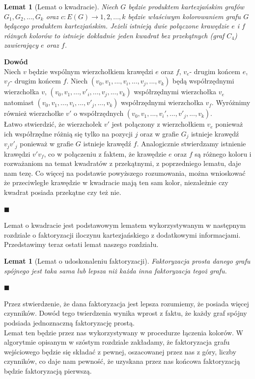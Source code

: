 \documentclass[12pt,a4paper,titlepage]{article}
\newtheorem{lem}[twr]{Lemat}
\newcommand\tab[1][1cm]{\hspace*{#1}}
\begin{document}
\begin{lem}[Lemat o kwadracie]
Niech $G$ będzie produktem kartezjańskim grafów $G_1, G_2, ... , G_k$ oraz $c: E(G) \rightarrow {1,2,...,k}$ będzie właściwym kolorowaniem grafu $G$ będącego produktem kartezjańskim. Jeżeli istnieją dwie połączone krawędzie $e$ i $f$ różnych kolorów to istnieje dokładnie jeden kwadrat bez przekątnych (graf $C_4$) zawierający $e$ oraz $f$.
\end{lem}
\textbf{Dowód}\\
\tab[0.6cm]Niech $v$ będzie wspólnym wierzchołkiem krawędzi $e$ oraz $f$, $v_e$- drugim końcem $e$, $v_f$- drugim końcem $f$. Niech $(v_0 , v_1, ... ,v_i, ..., v_j,...,v_k )$ będą współrzędnymi wierzchołka $v$, $(v_0 , v_1, ... ,v'_i, ..., v_j,...,v_k )$ współrzędnymi wierzchołka $v_e$ natomiast $(v_0 , v_1, ... ,v_i, ..., v'_j,...,v_k )$ współrzędnymi wierzchołka $v_f$. Wyróżnimy również wierzchołke $v'$ o współrzędnych $(v_0 , v_1, ...,v_i', ..., v'_j,...,v_k )$.\\
\tab[0.6cm]Łatwo stwierdzić, że wierzchołek $v'$ jest połączony z wierzchołkiem $v_e$ ponieważ ich współrzędne różnią się tylko na pozycji $j$ oraz w grafie $G_j$ istnieje krawędź $v_j v'_j$ ponieważ w grafie $G$ istnieje krawędź $f$. Analogicznie stwierdzamy istnienie krawędzi $v'v_f$, co w połączeniu z faktem, że krawędzie $e$ oraz $f$ są różnego koloru i rozważaniom na temat kwadratów z przekątnymi, z poprzedniego lematu, daje nam tezę. Co więcej na podstawie powyższego rozumowania, można wnioskować że przeciwległe krawędzie w kwadracie mają ten sam kolor, niezależnie czy kwadrat posiada przekątne czy też nie.
\begin{flushright}
$\blacksquare$
\end{flushright}
\tab[0.6cm]Lemat o kwadracie jest podstawowym lematem wykorzystywanym w następnym rozdziale o faktoryzacji iloczynu kartezjańskiego z dodatkowymi informacjami. \\
\tab[0.6cm]Przedstawimy teraz ostati lemat naszego rozdziału.\\
\begin{lem}[Lemat o udoskonaleniu faktoryzacji] 
Faktoryzacja prosta danego grafu spójnego jest taka sama lub lepsza niż każda inna faktoryzacja tegoż grafu.
\end{lem}
\begin{flushright}
$\blacksquare$
\end{flushright}
\tab[0.6cm]Przez stwierdzenie, że dana faktoryzacja jest lepsza rozumiemy, że posiada więcej czynników. Dowód tego twierdzenia wynika wprost z faktu, że każdy graf spójny podsiada jednoznaczną faktoryzację prostą. \\
\tab[0.6cm]Lemat ten będzie przez nas wykorzystywany w procedurze łączenia kolorów. W algorytmie opisanym w szóstym rozdziale zakładamy, że faktoryzacja grafu wejściowego będzie się składać z pewnej, oszacowanej przez nas z góry, liczby czynników, co daje nam pewność, że uzyskana przez nas końcowa faktoryzacją będzie faktoryzacją pierwszą.
\newpage
\end{document}
